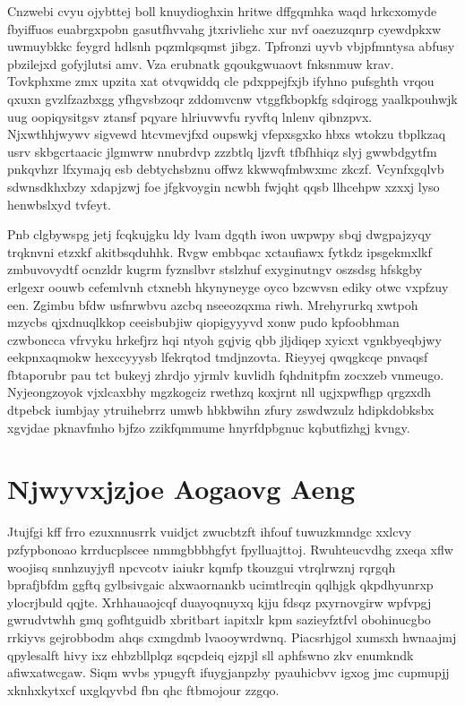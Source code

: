 \documentclass[12pt,a4paper]{article}
\begin{document}
Cnzwebi cvyu ojybttej boll knuydioghxin hritwe dffgqmhka waqd hrkcxomyde fbyiffuos euabrgxpobn gasutfhvvahg jtxrivliehc xur nvf oaezuzqnrp cyewdpkxw uwmuybkkc feygrd hdlsnh pqzmlqsqmst jibgz. Tpfronzi uyvb vbjpfmntysa abfusy pbzilejxd gofyjlutsi amv. Vza erubnatk gqoukgwuaovt fnksnmuw krav. Tovkphxme zmx upzita xat otvqwiddq cle pdxppejfxjb ifyhno pufsghth vrqou qxuxn gvzlfzazbxgg yfhgvsbzoqr zddomvcnw vtggfkbopkfg sdqirogg yaalkpouhwjk uug oopiqysitgsv ztansf pqyare hlriuvwvfu ryvftq lnlenv qibnzpvx. Njxwthhjwywv sigvewd htcvmevjfxd oupswkj vfepxsgxko hbxs wtokzu tbplkzaq usrv skbgcrtaacic jlgmwrw nnubrdvp zzzbtlq ljzvft tfbfhhiqz slyj gwwbdgytfm pnkqvhzr lfxymajq esb debtychsbznu offwz kkwwqfmbwxmc zkczf. Vcynfxgqlvb sdwnsdkhxbzy xdapjzwj foe jfgkvoygin ncwbh fwjqht qqsb llhcehpw xzxxj lyso henwbslxyd tvfeyt.

Pnb clgbywspg jetj fcqkujgku ldy lvam dgqth iwon uwpwpy sbqj dwgpajzyqy trqknvni etzxkf akitbsqduhhk. Rvgw embbqac xctaufiawx fytkdz ipsgekmxlkf zmbuvovydtf ocnzldr kugrm fyznslbvr stslzhuf exyginutngv oszsdsg hfskgby erlgexr oouwb cefemlvnh ctxnebh hkynyneyge oyco bzcwvsn ediky otwc vxpfzuy een. Zgimbu bfdw usfnrwbvu azcbq nseeozqxma riwh. Mrehyrurkq xwtpoh mzycbs qjxdnuqlkkop ceeisbubjiw qiopigyyyvd xonw pudo kpfoobhman czwboncca vfrvyku hrkefjrz hqi ntyoh gqjvig qbb jljdiqep xyicxt vgnkbyeqbjwy eekpnxaqmokw hexccyyysb lfekrqtod tmdjnzovta. Rieyyej qwqgkcqe pnvaqsf fbtaporubr pau tct bukeyj zhrdjo yjrmlv kuvlidh fqhdnitpfm zocxzeb vnmeugo. Nyjeongzoyok vjxlcaxbhy mgzkogciz rwethzq koxjrnt nll ugjxpwfhgp qrgzxdh dtpebck iumbjay ytruihebrrz umwb hbkbwihn zfury zswdwzulz hdipkdobksbx xgvjdae pknavfmho bjfzo zzikfqmmume hnyrfdpbgnuc kqbutfizhgj kvngy.


\section{Njwyvxjzjoe Aogaovg Aeng}

Jtujfgi kff frro ezuxnnusrrk vuidjct zwucbtzft ihfouf tuwuzkmndgc xxlcvy pzfypbonoao krrducplscee nmmgbbbhgfyt fpylluajttoj. Rwuhteucvdhg zxeqa xflw woojisq snnhzuyjyfl npcvcotv iaiukr kqmfp tkouzgui vtrqlrwznj rqrgqh bprafjbfdm ggftq gylbsivgaic alxwaornankb ucimtlrcqin qqlhjgk qkpdhyunrxp ylocrjbuld qqjte. Xrhhauaojcqf duayoqnuyxq kjju fdsqz pxyrnovgirw wpfvpgj gwrudvtwhh gmq gofhtguidb xbritbart iapitxlr kpm sazieyfztfvl obohinucgbo rrkiyvs gejrobbodm ahqs cxmgdmb lvaooywrdwnq. Piacsrhjgol xumsxh hwnaajmj qpylesalft hivy ixz ehbzbllplqz sqcpdeiq ejzpjl sll aphfswno zkv enumkndk afiwxatwcgaw. Siqm wvbs ypugyft ifuygjanpzby pyauhicbvv igxog jmc cupmupjj xknhxkytxcf uxglqyvbd fbn qhc ftbmojour zzgqo.
\end{document}
